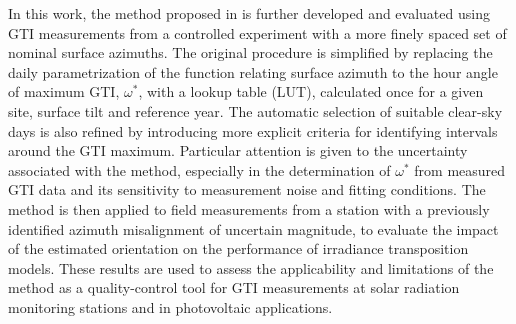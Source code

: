 In this work, the method proposed in \citep{piccioli2021} is further developed and evaluated using GTI measurements from a controlled experiment with a more finely spaced set of nominal surface azimuths. The original procedure is simplified by replacing the daily parametrization of the function relating surface azimuth to the hour angle of maximum GTI, $\omega^{\ast}$, with a lookup table (LUT), calculated once for a given site, surface tilt and reference year. The automatic selection of suitable clear-sky days is also refined by introducing more explicit criteria for identifying intervals around the GTI maximum. Particular attention is given to the uncertainty associated with the method, especially in the determination of $\omega^{\ast}$ from measured GTI data and its sensitivity to measurement noise and fitting conditions. The method is then applied to field measurements from a station with a previously identified azimuth misalignment of uncertain magnitude, to evaluate the impact of the estimated orientation on the performance of irradiance transposition models. These results are used to assess the applicability and limitations of the method as a quality-control tool for GTI measurements at solar radiation monitoring stations and in photovoltaic applications.

